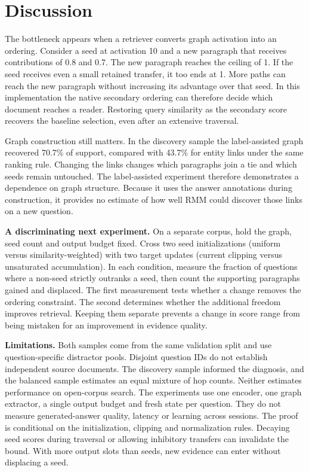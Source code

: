 \documentclass[11pt,a4paper]{article}
\begin{document}
\newpage
\section{Discussion}
The bottleneck appears when a retriever converts graph activation into an ordering. Consider a seed at activation 10 and a new paragraph that receives contributions of 0.8 and 0.7. The new paragraph reaches the ceiling of 1. If the seed receives even a small retained transfer, it too ends at 1. More paths can reach the new paragraph without increasing its advantage over that seed. In this implementation the native secondary ordering can therefore decide which document reaches a reader. Restoring query similarity as the secondary score recovers the baseline selection, even after an extensive traversal.

Graph construction still matters. In the discovery sample the label-assisted graph recovered 70.7\% of support, compared with 43.7\% for entity links under the same ranking rule. Changing the links changes which paragraphs join a tie and which seeds remain untouched. The label-assisted experiment therefore demonstrates a dependence on graph structure. Because it uses the answer annotations during construction, it provides no estimate of how well RMM could discover those links on a new question.

\textbf{A discriminating next experiment.} On a separate corpus, hold the graph, seed count and output budget fixed. Cross two seed initializations (uniform versus similarity-weighted) with two target updates (current clipping versus unsaturated accumulation). In each condition, measure the fraction of questions where a non-seed strictly outranks a seed, then count the supporting paragraphs gained and displaced. The first measurement tests whether a change removes the ordering constraint. The second determines whether the additional freedom improves retrieval. Keeping them separate prevents a change in score range from being mistaken for an improvement in evidence quality.

\textbf{Limitations.} Both samples come from the same validation split and use question-specific distractor pools. Disjoint question IDs do not establish independent source documents. The discovery sample informed the diagnosis, and the balanced sample estimates an equal mixture of hop counts. Neither estimates performance on open-corpus search. The experiments use one encoder, one graph extractor, a single output budget and fresh state per question. They do not measure generated-answer quality, latency or learning across sessions. The proof is conditional on the initialization, clipping and normalization rules. Decaying seed scores during traversal or allowing inhibitory transfers can invalidate the bound. With more output slots than seeds, new evidence can enter without displacing a seed.
\end{document}
